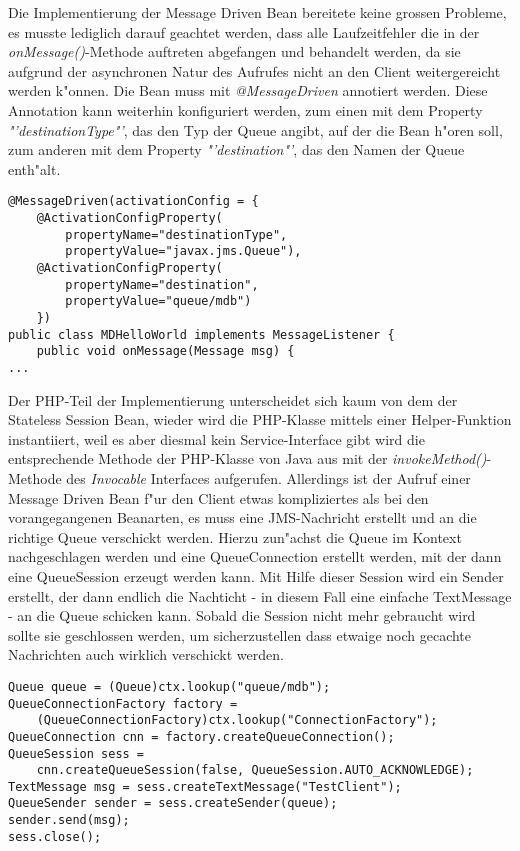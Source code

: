 Die Implementierung der Message Driven Bean bereitete keine grossen Probleme, es musste lediglich
darauf geachtet werden, dass alle Laufzeitfehler die in der \emph{onMessage()}-Methode auftreten
abgefangen und behandelt werden, da sie aufgrund der asynchronen Natur des Aufrufes nicht an den 
Client weitergereicht werden k"onnen. Die Bean muss mit \emph{@MessageDriven} annotiert werden.
Diese Annotation kann weiterhin konfiguriert werden, zum einen mit dem Property \emph{"'destinationType"'}, 
das den Typ der Queue angibt, auf der die Bean h"oren soll, zum anderen mit dem Property \emph{"'destination"'},
das den Namen der Queue enth"alt.
\begin{lstlisting}[caption=Konfiguration der Message Driven Bean]
@MessageDriven(activationConfig = {
    @ActivationConfigProperty(
        propertyName="destinationType", 
        propertyValue="javax.jms.Queue"),
    @ActivationConfigProperty(
        propertyName="destination", 
        propertyValue="queue/mdb")
    })
public class MDHelloWorld implements MessageListener {
    public void onMessage(Message msg) {
...
\end{lstlisting}
Der PHP-Teil der Implementierung unterscheidet sich kaum von dem der Stateless Session Bean, wieder wird
die PHP-Klasse mittels einer Helper-Funktion instantiiert, weil es aber diesmal kein Service-Interface gibt
wird die entsprechende Methode der PHP-Klasse von Java aus mit der \emph{invokeMethod()}-Methode des
\emph{Invocable} Interfaces aufgerufen.
Allerdings ist der Aufruf einer Message Driven Bean f"ur den Client etwas kompliziertes als bei den
vorangegangenen Beanarten, es muss eine JMS-Nachricht erstellt und an die richtige Queue verschickt werden.
Hierzu zun"achst die Queue im Kontext nachgeschlagen werden und eine QueueConnection erstellt werden, mit der
dann eine QueueSession erzeugt werden kann. Mit Hilfe dieser Session wird ein Sender erstellt, der dann
endlich die Nachticht - in diesem Fall eine einfache TextMessage - an die Queue schicken kann. Sobald die Session
nicht mehr gebraucht wird sollte sie geschlossen werden, um sicherzustellen dass etwaige noch gecachte Nachrichten
auch wirklich verschickt werden.
\begin{lstlisting}[caption=Senden einer JMS-Nachricht]
Queue queue = (Queue)ctx.lookup("queue/mdb");
QueueConnectionFactory factory = 
    (QueueConnectionFactory)ctx.lookup("ConnectionFactory");
QueueConnection cnn = factory.createQueueConnection();
QueueSession sess = 
    cnn.createQueueSession(false, QueueSession.AUTO_ACKNOWLEDGE);
TextMessage msg = sess.createTextMessage("TestClient");
QueueSender sender = sess.createSender(queue);
sender.send(msg);
sess.close();
\end{lstlisting}


